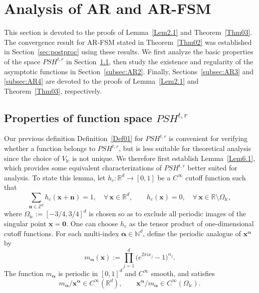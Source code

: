 \documentclass{sn-jnl}%
\numberwithin{equation}{section}
\theoremstyle{thmstyleone}%
\theoremstyle{thmstyletwo}%
\theoremstyle{thmstylethree}%
\begin{document}
\section{Analysis of AR and AR-FSM}
\label{sec:proofAR}

This section is devoted to the proofs of Lemma~\ref{Lem2.1} and Theorem~\ref{Thm03}. 
The convergence result for AR-FSM stated in Theorem~\ref{Thm02} was established in Section~\ref{sec:postproc} using these results.
We first analyze the basic properties of the space $PSH^{t,r}$ in Section~\ref{subsec:AR1}, then study the existence and regularity of the asymptotic functions in Section~\ref{subsec:AR2}. Finally, Sections~\ref{subsec:AR3} and \ref{subsec:AR4} are devoted to the proofs of Lemma~\ref{Lem2.1} and Theorem~\ref{Thm03}, respectively.

\subsection{Properties of function space $PSH^{t,r}$} 
\label{subsec:AR1} 
Our previous definition Definition~\ref{Def01} for $PSH^{t,r}$ is convenient for verifying whether a function belongs to $PSH^{t,r}$, but is less suitable for theoretical analysis since the choice of $V_{\mathrm{lc}}$ is not unique. We therefore first establish Lemma~\ref{Lem6.1}, which provides some equivalent characterizations of $PSH^{t,r}$ better suited for analysis.
To state this lemma, let $h_c:\mathbb{R}^d\to[0,1]$ be a $C^\infty$ cutoff function such that
\begin{equation}\label{eq-sec6.1-01}
\sum_{\bm n\in\mathbb Z^d} h_c(\bm x+\bm n)=1,
\quad
\forall\,\bm x\in\mathbb R^d,
\qquad
h_c(\bm x)=0,
\quad
\forall\,\bm x\in\mathbb{R}\setminus\Omega_{\mathrm{lc}},
\end{equation}
where $\Omega_{\mathrm{lc}}:= [-3/4,3/4]^d$ is chosen so as to exclude all periodic images of the singular point $\bm x=\bm 0$.
One can choose $h_c$ as the tensor product of one-dimensional cutoff functions. For each multi-index $\bm \alpha\in\mathbb N^d$, define the periodic analogue of $\bm x^{\bm \alpha}$ by
\begin{equation}\label{Eq-6.1-02}
    m_{\bm \alpha}(\bm x)
    :=
    \prod_{j=1}^{d}
    \bigl(e^{2\pi i x_j}-1\bigr)^{\alpha_j}.
\end{equation}
The function $m_{\bm \alpha}$ is periodic in $[0,1]^d$ and $C^\infty$ smooth, and satisfies
\[
m_{\bm \alpha}/\bm x^{\bm \alpha} \in C^{\infty}(\mathbb{R}^d),
\qquad
\bm x^{\bm \alpha}/m_{\bm \alpha} \in C^{\infty}(\Omega_{\mathrm{lc}}).
\]
\end{document}
